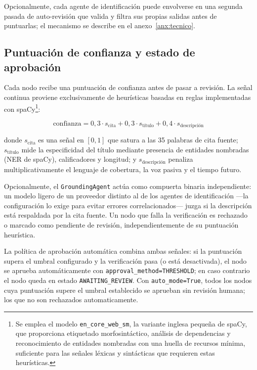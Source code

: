 Opcionalmente, cada agente de identificación puede envolverse en una segunda pasada de
auto-revisión que valida y filtra sus propias salidas antes de puntuarlas; el mecanismo se
describe en el anexo~\ref{anx:tecnico}.

\subsection{Puntuación de confianza y estado de aprobación}
\label{sec:confidence-scoring}

Cada nodo recibe una puntuación de confianza antes de pasar a revisión. La señal continua
proviene exclusivamente de heurísticas basadas en reglas implementadas con spaCy\footnote{%
  Se emplea el modelo \texttt{en\_core\_web\_sm}, la variante inglesa pequeña de spaCy, que
  proporciona etiquetado morfosintáctico, análisis de dependencias y reconocimiento de entidades
  nombradas con una huella de recursos mínima, suficiente para las señales léxicas y sintácticas
  que requieren estas heurísticas.%
}:

\begin{equation}
  \text{confianza} = 0{,}3 \cdot s_{\text{cita}} + 0{,}3 \cdot s_{\text{título}} + 0{,}4 \cdot s_{\text{descripción}}
\end{equation}

donde $s_{\text{cita}}$ es una señal en $[0,1]$ que satura a las 35 palabras de cita fuente;
$s_{\text{título}}$ mide la especificidad del título mediante presencia de entidades nombradas
(NER de spaCy), calificadores y longitud; y $s_{\text{descripción}}$ penaliza multiplicativamente
el lenguaje de cobertura, la voz pasiva y el tiempo futuro.

Opcionalmente, el \texttt{GroundingAgent} actúa como compuerta binaria independiente: un modelo
ligero de un proveedor distinto al de los agentes de identificación —la configuración lo exige
para evitar errores correlacionados— juzga si la descripción está respaldada por la cita fuente.
Un nodo que falla la verificación es rechazado o marcado como pendiente de revisión,
independientemente de su puntuación heurística.

La política de aprobación automática combina ambas señales: si la puntuación supera el umbral
configurado y la verificación pasa (o está desactivada), el nodo se aprueba automáticamente con
\texttt{approval\_method=THRESHOLD}; en caso contrario el nodo queda en estado \texttt{AWAITING\_REVIEW}.
Con \texttt{auto\_mode=True}, todos los nodos cuya puntuación supere el umbral establecido se
aprueban sin revisión humana; los que no son rechazados automaticamente.

